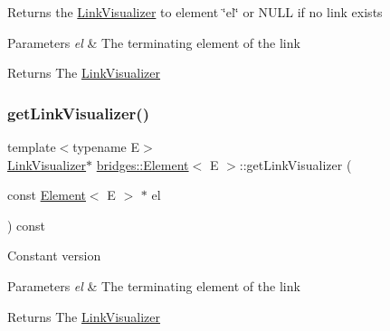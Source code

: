 Returns the \mbox{\hyperlink{classbridges_1_1_link_visualizer}{Link\+Visualizer}} to element \char`\"{}el\char`\"{} or N\+U\+LL if no link exists


\begin{DoxyParams}{Parameters}
{\em el} & The terminating element of the link\\
\hline
\end{DoxyParams}
\begin{DoxyReturn}{Returns}
The \mbox{\hyperlink{classbridges_1_1_link_visualizer}{Link\+Visualizer}} 
\end{DoxyReturn}
\mbox{\label{classbridges_1_1_element_a202553f482b9a49057c8c87a368cc93a}} 
\subsubsection{\texorpdfstring{get\+Link\+Visualizer()}{getLinkVisualizer()}\hspace{0.1cm}{\footnotesize\ttfamily [2/2]}}
{\footnotesize\ttfamily template$<$typename E$>$ \\
\mbox{\hyperlink{classbridges_1_1_link_visualizer}{Link\+Visualizer}}$\ast$ \mbox{\hyperlink{classbridges_1_1_element}{bridges\+::\+Element}}$<$ E $>$\+::get\+Link\+Visualizer (\begin{DoxyParamCaption}\item[{const \mbox{\hyperlink{classbridges_1_1_element}{Element}}$<$ E $>$ $\ast$}]{el }\end{DoxyParamCaption}) const\hspace{0.3cm}{\ttfamily [inline]}}

Constant version


\begin{DoxyParams}{Parameters}
{\em el} & The terminating element of the link \\
\hline
\end{DoxyParams}
\begin{DoxyReturn}{Returns}
The \mbox{\hyperlink{classbridges_1_1_link_visualizer}{Link\+Visualizer}} 
\end{DoxyReturn}
\mbox{\label{classbridges_1_1_element_a7df53b8b248020e9536bb951c725c7ba}} 
